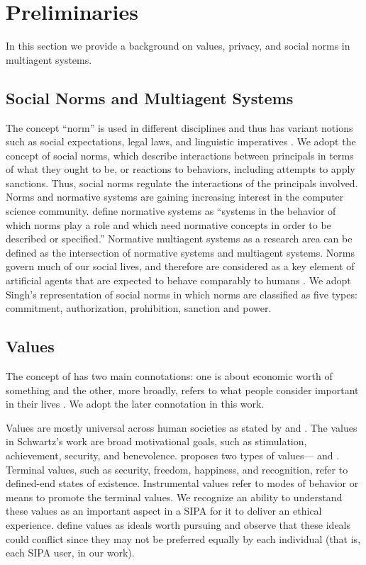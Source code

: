 \section{Preliminaries}

In this section we provide a background on values, privacy, and social norms in
multiagent systems.

\subsection{Social Norms and Multiagent Systems}

The concept ``norm'' is used in different disciplines and thus has
variant notions such as social expectations, legal laws, and linguistic
imperatives \citep{Boella2009NormativeSystems}. We adopt the concept of
social norms, which describe interactions between principals in terms of
what they ought to be, or reactions to behaviors, including attempts to
apply sanctions. Thus, social norms regulate the interactions of the
principals involved. Norms and normative systems are gaining increasing
interest in the computer science community. \citet{Meyer+Wieringa-93}
define normative systems as ``systems in the behavior of which norms
play a role and which need normative concepts in order to be described
or specified.'' Normative multiagent systems as a research area can be
defined as the intersection of normative systems and multiagent systems.
Norms govern much of our social lives, and therefore are considered as a
key element of artificial agents that are expected to behave comparably
to humans \citep{boella2006normative}. We adopt Singh's
 representation of social norms in which norms
are classified as five types: commitment, authorization, prohibition,
sanction and power.


\subsection{Values}

The concept of  has two main connotations: one is about economic worth of something and the other, more broadly, refers to what people consider important in their lives \cite{Friedman-2008-value-sensitive-design}. 
We adopt the later connotation in this work.

Values are mostly universal across human societies as stated by \citet{schwartz2012overview} and \citet{rokeach1973nature}. 
The values in Schwartz's \cite{schwartz2012overview} work are broad motivational goals, such as stimulation, achievement, security, and benevolence. 
\citet{rokeach1973nature} proposes two types of values--- and . 
Terminal values, such as security, freedom, happiness, and recognition, refer to defined-end states of existence. 
Instrumental values refer to modes of behavior or means to promote the terminal values. 
%
We recognize an ability to understand these values as an important aspect in a SIPA for it to deliver an ethical experience.
\citet{Dechesne-AIL13-Norms+Values} define values as ideals worth pursuing and observe that these ideals could conflict since
they may not be preferred equally by each individual (that is, each SIPA user, in our work).


